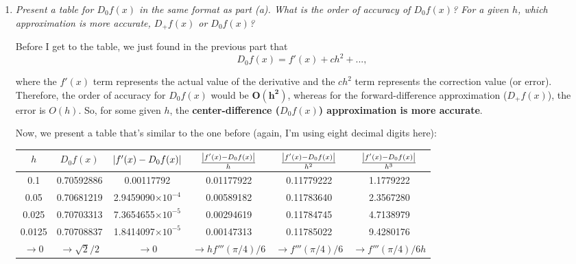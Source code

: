\begin{enumerate}[label=(\alph*)]
    Finally, divide by $2h$ to get the expression:
    \begin{equation*}
      D_{0}f(x) = \frac{f(x+h) - f(x-h)}{2h} = f'(x) + \frac{1}{6}f'''(x)h^{2} + ... =  \boxed{f'(x) + ch^{2} + ...}
    \end{equation*}

  \item \textit{Present a table for $D_{0}f(x)$ in the same format as part (a). What is the order of accuracy of $D_{0}f(x)$? For a given $h$, which approximation is more accurate, $D_{+}f(x)$ or $D_{0}f(x)$?}
      \vspace{1em}

    Before I get to the table, we just found in the previous part that 
    \begin{equation*}
      D_{0}f(x) = f'(x) + ch^{2} + ...,
    \end{equation*}

    where the $f'(x)$ term represents the actual value of the derivative and the $ch^{2}$ term represents the correction value (or error). Therefore, the order of accuracy for $D_{0}f(x)$ would be $\mathbf{O(h^{2})}$, whereas for the forward-difference approximation ($D_{+}f(x)$), the error is $O(h)$. So, for some given $h$, the \textbf{center-difference ($D_{0}f(x)$) approximation is more accurate}.
      \vspace{1em}

    Now, we present a table that's similar to the one before (again, I'm using eight decimal digits here):
    \begin{table}[h!]
      \centering
      \begin{tabular}{|c|c|c|c|c|c|}
        \hline
        \rule{0pt}{3ex}$h$ & $D_{0}f(x)$ & $\abs{f'(x) - D_{0}f(x)}$ & $\frac{\abs{f'(x) - D_{0}f(x)}}{h}$ & $\frac{\abs{f'(x) - D_{0}f(x)}}{h^{2}}$ & $\frac{\abs{f'(x) - D_{0}f(x)}}{h^{3}}$ \\
        \hline
        0.1    & 0.70592886 & 0.00117792   & 0.01177922 & 0.11779222 
               & 1.1779222 \\
        0.05   & 0.70681219 & 2.9459090$\times 10^{-4}$ & 0.00589182 & 0.11783640 
               & 2.3567280 \\
        0.025  & 0.70703313 & 7.3654655$\times 10^{-5}$ & 0.00294619 & 0.11784745 
               & 4.7138979 \\
        0.0125 & 0.70708837 & 1.8414097$\times 10^{-5}$  & 0.00147313 & 0.11785022 
               & 9.4280176 \\
        \hline
        \multicolumn{1}{|c|}{\rule{0pt}{2.5ex}$\rightarrow 0$} & \multicolumn{1}{c|}{\rule{0pt}{2.5ex}$\rightarrow \sqrt{2}/2$} & \multicolumn{1}{c|}{\rule{0pt}{2.5ex}$\rightarrow 0$} & \multicolumn{1}{c|}{\rule{0pt}{2.5ex}$\rightarrow hf'''(\pi/4)/6$} & \multicolumn{1}{c|}{\rule{0pt}{2.5ex}$\rightarrow f'''(\pi/4)/6$} & \multicolumn{1}{c|}{\rule{0pt}{2.5ex}$\rightarrow f'''(\pi/4)/6h$} \\
        \hline
      \end{tabular}
    \end{table}


\end{enumerate}
